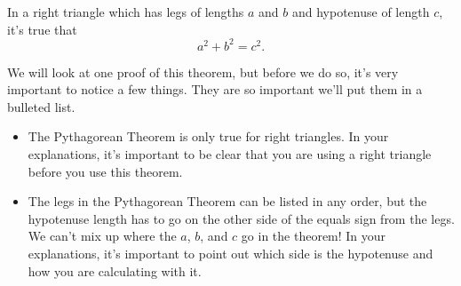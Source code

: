 \documentclass{ximera}
\begin{document}
\begin{theorem}
 In a right triangle which has legs of lengths $a$ and $b$ and hypotenuse of length $c$, it's true that
\[
a^2 + b^2 = c^2.
\]
\end{theorem}

We will look at one proof of this theorem, but before we do so, it's very important to notice a few things. They are so important we'll put them in a bulleted list.
\begin{itemize}
	\item The Pythagorean Theorem is only true for right triangles. In your explanations, it's important to be clear that you are using a right triangle before you use this theorem.
	\item The legs in the Pythagorean Theorem can be listed in any order, but the hypotenuse length has to go on the other side of the equals sign from the legs. We can't mix up where the $a$, $b$, and $c$ go in the theorem! In your explanations, it's important to point out which side is the hypotenuse and how you are calculating with it.
\end{itemize}
\end{document}
